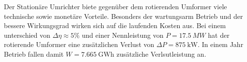 Der Stationäre Umrichter biete gegenüber dem rotierenden Umformer viele technische sowie monetäre Vorteile. 
Besonders der wartungsarm Betrieb und der bessere Wirkungsgrad wirken sich auf die laufenden Kosten aus.
Bei einem unterschied von $\Delta\eta\approx 5\%$ und einer Nennleistung von $P=\SI[]{17.5}{MW}$ hat der rotierende Umformer 
eine zusätzlichen Verlust von $\Delta P=\SI[]{875}{\kilo\watt}$. 
In einem Jahr Betrieb fallen damit $W=\SI{7.665}{\giga\watt\hour}$ zusätzliche Verlsutleistung an.

